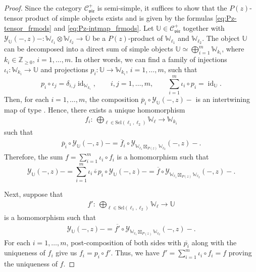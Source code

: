 \documentclass[pdftex]{sigma}
\numberwithin{equation}{section}
\newcommand{\ol}[1]{\overline{#1}}
\newcommand{\id}{\operatorname{id}}
\newcommand{\bZ}{\mathbb{Z}}
\newcommand{\cC}{\mathcal{C}}
\newcommand{\catVir}{\cC_{\vir}}
\newcommand{\Sel}{\mathrm{Sel}}
\newcommand{\voaint}{\mathcal{Y}}
\newcommand{\inttyp}[3]{\binom{#3}{#1 #2}}
\newcommand{\virmod}{\mathbb{W}}
\newcommand{\virmodgen}{\mathbb{U}}
\newcommand{\vir}{\mathfrak{vir}}
\begin{document}
\begin{proof}
Since the category $\catVir^{+}$ is semi-simple, it suffices to show that the $P(z)$-tensor product of simple objects exists and is given by the formulas \eqref{eq:Pz-tensor_frmods} and \eqref{eq:Pz-intmap_frmods}.
Let $\virmodgen\in \catVir^{+}$ together with $\voaint_{\virmodgen} (-,z)-\colon \virmod_{\ell_{1}}\otimes\virmod_{\ell_{2}}\to\ol{\virmodgen}$ be a $P(z)$-product of $\virmod_{\ell_{1}}$ and $\virmod_{\ell_{2}}$.
The object $\virmodgen$ can be decomposed into a direct sum of simple objects
$
 \virmodgen\simeq \bigoplus_{i=1}^{m}\virmod_{k_{i}}$,
where $k_{i}\in\bZ_{\geq 0}$, $i=1,\dots, m$.
In other words, we can find a family of injections $\iota_{i}\colon \virmod_{k_{i}}\to \virmodgen$ and projections $p_{i}\colon \virmodgen\to\virmod_{k_{i}}$, $i=1,\dots, m$, such that
\[%
 p_{i}\circ \iota_{j}=\delta_{i,j}\id_{\virmod_{k_{i}}},\qquad i,j=1,\dots,m,\qquad \sum_{i=1}^{m}\iota_{i}\circ p_{i}=\id_{\virmodgen}.
\]
Then, for each $i=1,\dots, m$, the composition
$\ol{p}_{i}\circ \voaint_{\virmodgen}(-,z)-$
is an intertwining map of type \smash{$\inttyp{\virmod_{\ell_{1}}}{\virmod_{\ell_{2}}}{\virmod_{k_{i}}}$}.
Hence, there exists a unique homomorphism
\begin{gather*}
 f_{i}\colon\ \bigoplus_{\ell\in\Sel(\ell_{1},\ell_{2})}\virmod_{\ell}\to\virmod_{k_{i}}
\end{gather*}
such that
\begin{gather*}
 \ol{p}_{i}\circ \voaint_{\virmodgen}(-,z)-=\ol{f}_{i}\circ \voaint_{\virmod_{\ell_{1}}\boxtimes_{P(z)}\virmod_{\ell_{2}}}(-,z)-.
\end{gather*}
Therefore, the sum $f=\sum_{i=1}^{m}\iota_{i}\circ f_{i}$ is a homomorphism such that
\[%
 \voaint_{\virmodgen}(-,z)-=\sum_{i=1}^{m}\ol{\iota_{i}\circ p_{i}}\circ \voaint_{\virmodgen}(-,z)-=\ol{f}\circ \voaint_{\virmod_{\ell_{1}}\boxtimes_{P(z)}\virmod_{\ell_{2}}}(-,z)-.
\]

Next, suppose that
\begin{gather*}
	f' \colon\ \bigoplus_{\ell\in\Sel(\ell_{1},\ell_{2})}\virmod_{\ell}\to \virmodgen
\end{gather*}
is a homomorphism such that
\begin{gather*}
	\voaint_{\virmodgen}(-,z)-=\ol{f'}\circ \voaint_{\virmod_{\ell_{1}}\boxtimes_{P(z)}\virmod_{\ell_{2}}}(-,z)-.
\end{gather*}
For each $i=1,\dots, m$, post-composition of both sides with $\ol{p_{i}}$ along with the uniqueness of $f_{i}$
give us $f_{i} = p_{i}\circ f'$. Thus, we have
$
	f' = \sum_{i=1}^{m}\iota_{i}\circ f_{i} = f
$
proving the uniqueness of $f$.
\end{proof}
\end{document}
